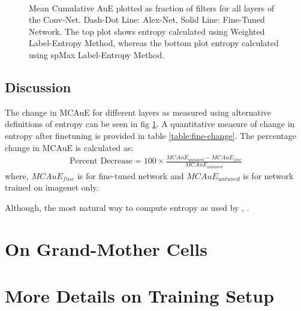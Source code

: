 \documentclass[runningheads]{llncs}
\begin{document}
\begin{figure}
\centering
{} \\
\caption{Mean Cumulative AuE plotted as fraction of filters for all layers of the Conv-Net. Dash-Dot Line: Alex-Net, Solid Line: Fine-Tuned Network. The top plot shows entropy calculated using Weighted Label-Entropy Method, whereas the bottom plot entropy calculated using spMax Label-Entropy Method.}
\label{fig:fine-entropy}
\end{figure}

\subsection{Discussion}
The change in MCAuE for different layers as measured using alternative definitions of entropy can be seen in fig \ref{fig:fine-entropy}. A quantitative measure of change in entropy after finetuning is provided in table \ref{table:fine-change}. The percentage change in MCAuE is calculated as:
\begin{eqnarray}
\text{Percent Decrease} = 100 \times \frac{MCAuE_{untuned} - MCAuE_{fine}}{MCAuE_{untuned}}
\end{eqnarray}
where, $MCAuE_{fine}$ is for fine-tuned network and $MCAuE_{untuned}$ is for network trained on imagenet only.

Although, the most natural way to compute entropy as used by \cite{Breiman}, \cite{AmitGeman}.

\section{On Grand-Mother Cells}

\section{More Details on Training Setup} 





\end{document}
